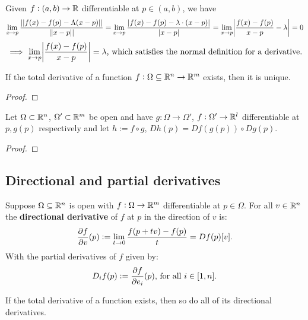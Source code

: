 \documentclass[../Year2.tex]{subfiles}
\begin{document}
\begin{remark}
    Given $f:(a,b)\rightarrow\mathbb{R}$ differentiable at $p\in(a,b)$, we have 
    \[
            \lim_{x\rightarrow p} \frac{||f(x)-f(p)-\Lambda(x-p)||}{||x-p||}
            = \lim_{x\rightarrow p} \frac{|f(x)-f(p)-\lambda\cdot(x-p)|}{|x-p|}
            = \lim_{x\rightarrow p} \abs{\frac{f(x)-f(p)}{x-p}-\lambda}=0
    \] \vspace{-10pt}
    \[
        \implies \lim_{x\rightarrow p} \abs{\frac{f(x)-f(p)}{x-p}}=\lambda 
        \text{\textcolor{black}{, which satisfies the normal definition for a derivative.}}
    \]
\end{remark}

\begin{theorem}
    If the total derivative of a function $f:\Omega\subseteq\mathbb{R}^n\rightarrow\mathbb{R}^m$ exists, then it is unique.
    \begin{proof}
        
    \end{proof}
\end{theorem}

\begin{theorem}
    Let $\Omega\subset\mathbb{R}^n$, $\Omega'\subset\mathbb{R}^m$ be open and have $g:\Omega\rightarrow\Omega'$, $f:\Omega'\rightarrow\mathbb{R}^l$ differentiable at $p,g(p)$ respectively and let $h:=f\circ g$, $Dh(p) = Df(g(p))\circ Dg(p)$.
    \begin{proof}
        
    \end{proof}
\end{theorem}

\subsection{Directional and partial derivatives}

\begin{definition}
    Suppose $\Omega\subseteq\mathbb{R}^n$ is open with $f:\Omega\rightarrow\mathbb{R}^m$ differentiable at $p\in\Omega$. For all $v\in\mathbb{R}^n$ the \textbf{directional derivative} of $f$ at $p$ in the direction of $v$ is: \[
        \frac{\partial f}{\partial v}(p) := \lim_{t\rightarrow 0} \frac{f(p+tv)-f(p)}{t} = Df(p)[v]\text{\textcolor{black}{.}}
    \] With the partial derivatives of $f$ given by: \[
        D_i f(p):=\frac{\partial f}{\partial e_i}(p) \text{\textcolor{black}{, for all }} i\in[1,n]\text{\textcolor{black}{.}}
    \]
\end{definition}

\begin{remark}
    If the total derivative of a function exists, then so do all of its directional derivatives.
\end{remark}
\end{document}
